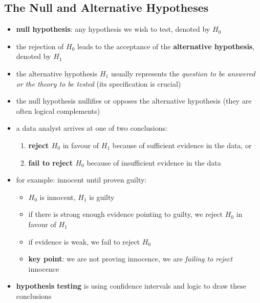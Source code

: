 \documentclass[10pt]{article}
\begin{document}
\subsection{The Null and Alternative Hypotheses}
\begin{itemize}
    \item \textbf{null hypothesis}: any hypothesis we wish to test, denoted by $ H_0$
    \item the rejection of $H_0$ leads to the acceptance of the \textbf{alternative hypothesis}, denoted by $H_1$ 
    \item the alternative hypothesis $H_1$ usually represents the \textit{question to be answered or the theory to be tested} (its specification is crucial)
    \item the null hypothesis nullifies or opposes the alternative hypothesis (they are often logical complements)
    \item a data analyst arrives at one of two conclusions:
        \begin{enumerate}
            \item \textbf{reject $H_0$} in favour of $H_1$ because of sufficient evidence in the data, or
            \item \textbf{fail to reject $H_0$} because of insufficient evidence in the data
        \end{enumerate}
    \item for example: innocent until proven guilty:
        \begin{itemize}
            \item $H_0$ is innocent, $H_1$ is guilty 
            \item if there is strong enough evidence pointing to guilty, we reject $H_0$ in favour of $H_1$
            \item if evidence is weak, we fail to reject $H_0$ 
            \item \textbf{key point}: we are not proving innocence, we are \textit{failing to reject} innocence
        \end{itemize}
    \item \textbf{hypothesis testing} is using confidence intervals and logic to draw these conclusions
\end{itemize} 
\end{document}
